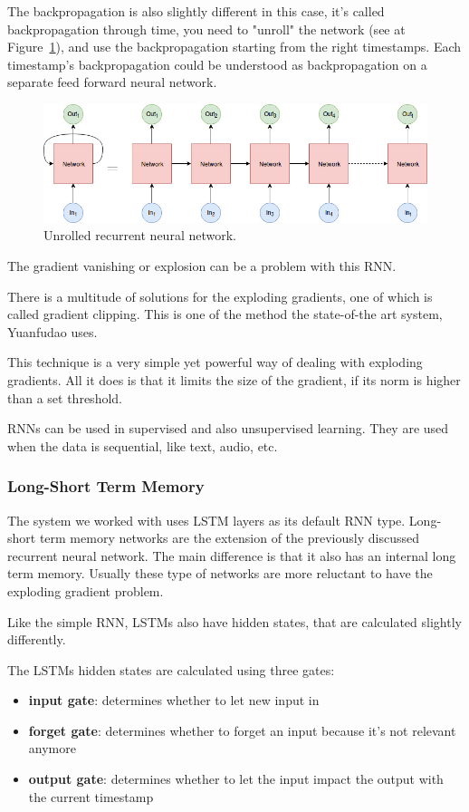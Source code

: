 The backpropagation is also slightly different in this case, it's called backpropagation through time, you need to "unroll" the network (see at Figure~\ref{fig:unrolled}), and use the backpropagation starting from the right timestamps. Each timestamp's backpropagation could be understood as backpropagation on a separate feed forward neural network. 
\begin{figure}[!htb]
	\centering
	\includegraphics[scale=0.5]{unrolled.jpg}
	\caption{Unrolled recurrent neural network.}
	\label{fig:unrolled}
\end{figure}

The gradient vanishing or explosion can be a problem with this RNN.

There is a multitude of solutions for the exploding gradients, one of which is called gradient clipping. This is one of the method the state-of-the art system, Yuanfudao uses.

This technique is a very simple yet powerful way of dealing with exploding gradients. All it does is that it limits the size of the gradient, if its norm is higher than a set threshold.

RNNs can be used in supervised and also unsupervised learning. They are used when the data is sequential, like text, audio, etc.

\subsubsection{Long-Short Term Memory}
The system we worked with uses LSTM layers as its default RNN type.
Long-short term memory networks are the extension of the previously discussed recurrent neural network. The main difference is that it also has an internal long term memory. Usually these type of networks are more reluctant to have the exploding gradient problem.

Like the simple RNN, LSTMs also have hidden states, that are calculated slightly differently.
\\

\begin{minipage}{\textwidth}
The LSTMs hidden states are calculated using three gates:
\begin{itemize}
	\item \textbf{input gate}: determines whether to let new input in
	\item \textbf{forget gate}: determines whether to forget an input because it's not relevant anymore
	\item \textbf{output gate}: determines whether to let the input impact the output with the current timestamp
\end{itemize}
\end{minipage}

